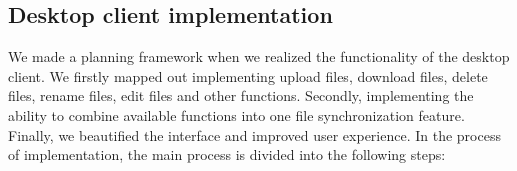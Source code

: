 \documentclass[a4paper]{article}
\begin{document}

\begin{flushleft}
{



}

\section{Desktop client implementation}
We made a planning framework when we realized the functionality of the desktop client. We firstly mapped out implementing upload files, download files, delete files, rename files, edit files and other functions. Secondly, implementing the ability to combine available functions into one file synchronization feature. Finally, we beautified the interface and improved user experience.\newline
In the process of implementation, the main process is divided into the following steps:\newline





\end{flushleft}
\end{document}
